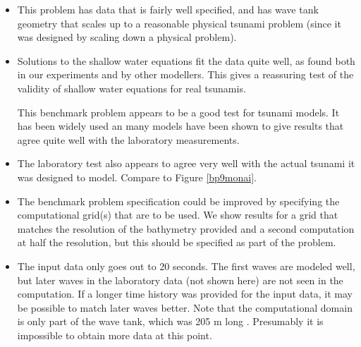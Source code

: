 \begin{itemize}
\item This problem has data that is fairly well specified, and has wave tank
geometry that scales up to a reasonable physical tsunami problem (since it
was designed by scaling down a physical problem).  

\item Solutions to the shallow water equations fit the data quite well, as
found both in our experiments and by other modellers.  This gives a
reassuring test of the validity of shallow water equations for real
tsunamis.

This benchmark problem appears to be a good test for tsunami models.  It has
been widely used an many models have been shown to give results that agree
quite well with the laboratory measurements.

\item The laboratory test also appears to agree very well with the actual
tsunami it was designed to model.  Compare  to Figure
\ref{bp9monai}.

\item The benchmark problem specification could be improved by specifying the
computational grid(s) that are to be used.  We show results for a grid that
matches the resolution of the bathymetry provided and a second computation
at half the resolution, but this should be specified as part of the problem.

\item The input data only goes out to 20 seconds.
The first waves are modeled well, but later waves  in the laboratory data
(not shown here) are not seen in the
computation.  If a longer time history was provided for the input data, it
may be possible to match later waves better.  Note that the computational
domain is only part of the wave tank, which was 205 m long
\cite{MatsuyamaTanaka:monai}.
Presumably it is impossible to obtain more data at this point.


\end{itemize} 
